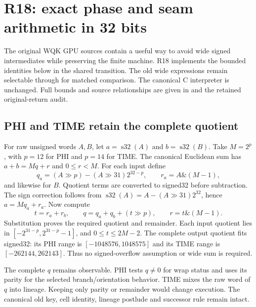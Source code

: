 \section{R18: exact phase and seam arithmetic in 32 bits}
\label{sec:r18-phase}

The original WQK GPU sources contain a useful way to avoid wide signed
intermediates while preserving the finite machine. R18 implements the
bounded identities below in the shared transition. The old wide expressions
remain selectable through  for matched
comparison. The canonical C interpreter is unchanged. Full bounds and source
relationships are given in  and the retained
original-return audit.

\subsection{PHI and TIME retain the complete quotient}
For raw unsigned words $A,B$, let $a=\operatorname{s32}(A)$ and
$b=\operatorname{s32}(B)$. Take $M=2^p$, with $p=12$ for PHI and $p=14$
for TIME. The canonical Euclidean sum has $a+b=Mq+r$ and $0\le r<M$.
For each input define
\begin{equation}
 q_a=(A\gg p)-(A\gg31)2^{32-p},\qquad
 r_a=A\mathbin{\&}(M-1),
\end{equation}
and likewise for $B$. Quotient terms are converted to signed32 before
subtraction. The sign correction follows from
$\operatorname{s32}(A)=A-(A\gg31)2^{32}$, hence $a=Mq_a+r_a$.
Now compute
\begin{equation}
 t=r_a+r_b,\qquad q=q_a+q_b+(t\gg p),\qquad
 r=t\mathbin{\&}(M-1).
 \label{eq:r18-divmod}
\end{equation}
Substitution proves the required quotient and remainder. Each input
quotient lies in $[-2^{31-p},2^{31-p}-1]$, and $0\le t\le2M-2$.
The complete output quotient fits signed32: its PHI range is
$[-1048576,1048575]$ and its TIME range is $[-262144,262143]$.
Thus no signed-overflow assumption or wide sum is required.

The complete $q$ remains observable. PHI tests $q\ne0$ for wrap status and
uses its parity for the selected branch/orientation behavior. TIME mixes
the raw word of $q$ into lineage. Keeping only parity or remainder would
change execution. The canonical old key, cell identity, lineage postlude
and successor rule remain intact.


